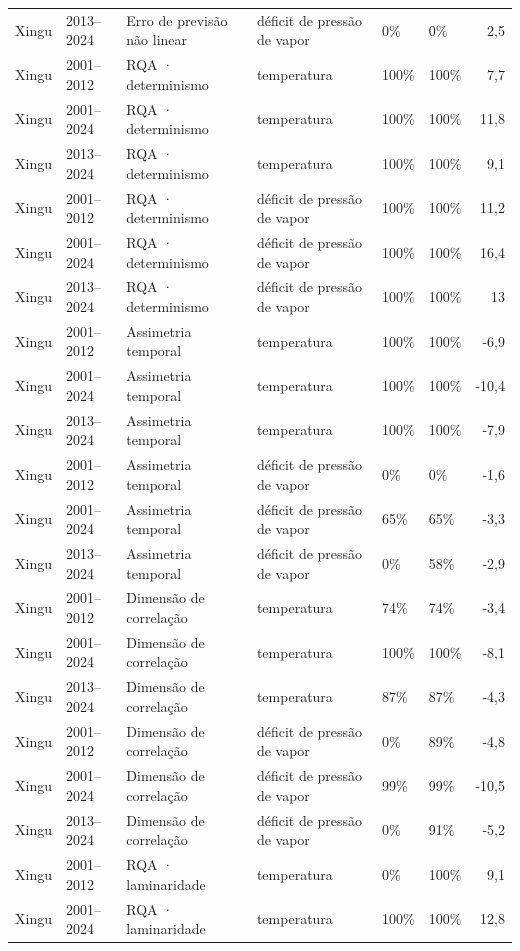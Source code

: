 \begin{table}
\begin{tabular}{llllllr}
Xingu & 2013–2024 & Erro de previsão não linear & déficit de pressão de vapor & 0\% & 0\% & 2,5 \\
Xingu & 2001–2012 & RQA · determinismo & temperatura & 100\% & 100\% & 7,7 \\
Xingu & 2001–2024 & RQA · determinismo & temperatura & 100\% & 100\% & 11,8 \\
Xingu & 2013–2024 & RQA · determinismo & temperatura & 100\% & 100\% & 9,1 \\
Xingu & 2001–2012 & RQA · determinismo & déficit de pressão de vapor & 100\% & 100\% & 11,2 \\
Xingu & 2001–2024 & RQA · determinismo & déficit de pressão de vapor & 100\% & 100\% & 16,4 \\
Xingu & 2013–2024 & RQA · determinismo & déficit de pressão de vapor & 100\% & 100\% & 13 \\
Xingu & 2001–2012 & Assimetria temporal & temperatura & 100\% & 100\% & -6,9 \\
Xingu & 2001–2024 & Assimetria temporal & temperatura & 100\% & 100\% & -10,4 \\
Xingu & 2013–2024 & Assimetria temporal & temperatura & 100\% & 100\% & -7,9 \\
Xingu & 2001–2012 & Assimetria temporal & déficit de pressão de vapor & 0\% & 0\% & -1,6 \\
Xingu & 2001–2024 & Assimetria temporal & déficit de pressão de vapor & 65\% & 65\% & -3,3 \\
Xingu & 2013–2024 & Assimetria temporal & déficit de pressão de vapor & 0\% & 58\% & -2,9 \\
Xingu & 2001–2012 & Dimensão de correlação & temperatura & 74\% & 74\% & -3,4 \\
Xingu & 2001–2024 & Dimensão de correlação & temperatura & 100\% & 100\% & -8,1 \\
Xingu & 2013–2024 & Dimensão de correlação & temperatura & 87\% & 87\% & -4,3 \\
Xingu & 2001–2012 & Dimensão de correlação & déficit de pressão de vapor & 0\% & 89\% & -4,8 \\
Xingu & 2001–2024 & Dimensão de correlação & déficit de pressão de vapor & 99\% & 99\% & -10,5 \\
Xingu & 2013–2024 & Dimensão de correlação & déficit de pressão de vapor & 0\% & 91\% & -5,2 \\
Xingu & 2001–2012 & RQA · laminaridade & temperatura & 0\% & 100\% & 9,1 \\
Xingu & 2001–2024 & RQA · laminaridade & temperatura & 100\% & 100\% & 12,8 \\

\end{tabular}
\end{table}
